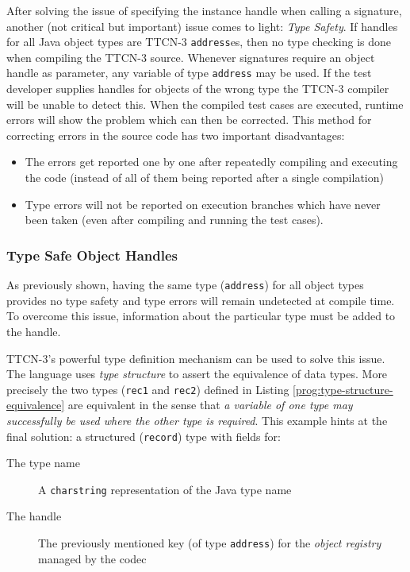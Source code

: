 After solving the issue of specifying the instance handle
when calling a signature,
another (not critical but important) issue comes to light: \emph{Type Safety}.
If handles for all Java object types are \ac{TTCN-3} \verb=address=es,
then no type checking is done when compiling the \ac{TTCN-3} source.
Whenever signatures require an object handle as parameter,
any variable of type \verb=address= may be used.
If the test developer supplies handles for objects of the wrong type
the \ac{TTCN-3} compiler will be unable to detect this.
When the compiled test cases are executed,
runtime errors will show the problem which can then be corrected.
This method for correcting errors in the source code
has two important disadvantages:
\begin{itemize}
\item The errors get reported one by one
after repeatedly compiling and executing the code
(instead of all of them being reported after a single compilation)
\item Type errors will not be reported on execution branches
which have never been taken (even after compiling and running the test cases).
\end{itemize}


\subsubsection{Type Safe Object Handles}
\label{sec:type-safe-object-handles}

As previously shown, having the same type (\verb=address=) for all object types
provides no type safety and type errors will remain undetected at compile time.
To overcome this issue, information about the particular type
must be added to the handle.

\ac{TTCN-3}'s powerful type definition mechanism
can be used to solve this issue.
The language uses \emph{type structure}
to assert the equivalence of data types.
More precisely the two types (\verb=rec1= and \verb=rec2=) defined
in Listing \ref{prog:type-structure-equivalence} are equivalent
in the sense that \emph{a variable of one type may successfully be used
where the other type is required}.
This example hints at the final solution:
a structured (\verb=record=) type with fields for:
\begin{description}
\item[The type name] A \verb=charstring= representation of the Java type name
\item[The handle] The previously mentioned key (of type \verb=address=)
for the \emph{object registry} managed by the codec
\end{description}

